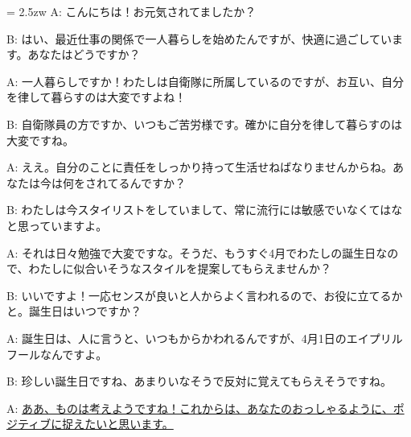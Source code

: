 \documentclass[11pt]{amsart}
\title{}
\author{}
\newenvironment{hangall}[1]{\hangindent = 2.5zw\everypar{\hangindent = 2.5zw}}{}
\begin{document}
\maketitle
\begin{hangall}{}%
A: こんにちは！お元気されてましたか？

B: はい、最近仕事の関係で一人暮らしを始めたんですが、快適に過ごしています。あなたはどうですか？

A: 一人暮らしですか！わたしは自衛隊に所属しているのですが、お互い、自分を律して暮らすのは大変ですよね！

B: 自衛隊員の方ですか、いつもご苦労様です。確かに自分を律して暮らすのは大変ですね。

A: ええ。自分のことに責任をしっかり持って生活せねばなりませんからね。あなたは今は何をされてるんですか？

B: わたしは今スタイリストをしていまして、常に流行には敏感でいなくてはなと思っていますよ。

A: それは日々勉強で大変ですな。そうだ、もうすぐ4月でわたしの誕生日なので、わたしに似合いそうなスタイルを提案してもらえませんか？

B: いいですよ！一応センスが良いと人からよく言われるので、お役に立てるかと。誕生日はいつですか？

A: 誕生日は、人に言うと、いつもからかわれるんですが、4月1日のエイプリルフールなんですよ。

B: 珍しい誕生日ですね、あまりいなそうで反対に覚えてもらえそうですね。

A: \ul{ああ、ものは考えようですね！これからは、あなたのおっしゃるように、ポジティブに捉えたいと思います。}\end{hangall}
\end{document}
